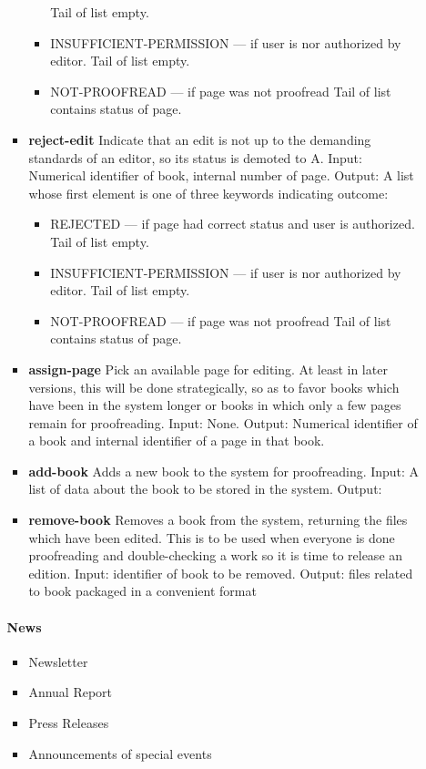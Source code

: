 \begin{itemize}
\begin{itemize}
\begin{itemize}
\begin{itemize}
    Tail of list empty. 
  \item INSUFFICIENT-PERMISSION --- if user is
    nor authorized by editor. Tail of list empty. 
  \item NOT-PROOFREAD
    --- if page was not proofread Tail of list contains status of page.
  \end{itemize}
\item
  {\bf reject-edit}  Indicate that an edit is not up to the demanding
  standards of an editor, so its status is demoted to A.  Input:
  Numerical identifier of book, internal number of page.  Output: A
  list whose first element is one of three keywords indicating outcome:
  \begin{itemize}
  \item REJECTED --- if page had correct status and user is
    authorized. Tail of list empty. 
  \item INSUFFICIENT-PERMISSION ---
    if user is nor authorized by editor. Tail of list empty. 
  \item
    NOT-PROOFREAD --- if page was not proofread Tail of list contains
    status of page.
  \end{itemize}
\item
  {\bf assign-page}  Pick an available page for editing. At least in later
  versions, this will be done strategically, so as to favor books which
  have been in the system longer or books in which only a few pages
  remain for proofreading.  Input: None.  Output: Numerical
  identifier of a book and internal identifier of a page in that book.
\item
  {\bf add-book}  Adds a new book to the system for proofreading.  Input:
  A list of data about the book to be stored in the system.  Output:
\item
  {\bf remove-book}  Removes a book from the system, returning the files
  which have been edited. This is to be used when everyone is done
  proofreading and double-checking a work so it is time to release an
  edition.  Input: identifier of book to be removed.  Output: files
  related to book packaged in a convenient format
\end{itemize}

\paragraph{News}

\begin{itemize}
\item
  Newsletter
\item
  Annual Report
\item
  Press Releases
\item
  Announcements of special events
\end{itemize}


\end{itemize}
\end{itemize}
